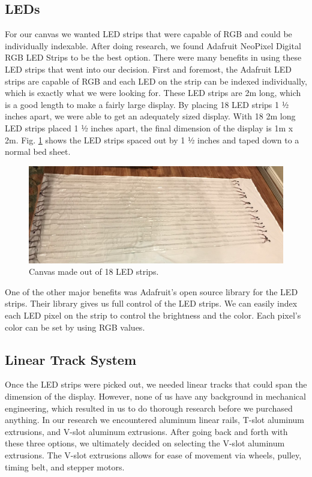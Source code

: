\documentclass[11pt]{IEEEtran}
\begin{document}
\subsection{LEDs}
For our canvas we wanted LED strips that were capable of RGB and could be individually indexable. After doing research, we found Adafruit NeoPixel Digital RGB LED Strips to be the best option. There were many benefits in using these LED strips that went into our decision. First and foremost, the Adafruit LED strips are capable of RGB and each LED on the strip can be indexed individually, which is exactly what we were looking for. These LED strips are 2m long, which is a good length to make a fairly large display. By placing 18 LED strips 1 ½ inches apart, we were able to get an adequately sized display. With 18 2m long LED strips placed 1 ½ inches apart, the final dimension of the display is 1m x 2m. Fig. \ref{fig:ledstripsonsheet} shows the LED strips spaced out by 1 ½ inches and taped down to a normal bed sheet.

\begin{figure}[H]
  \centering
  \includegraphics[width=\columnwidth]{image6.png}
  \caption{Canvas made out of 18 LED strips.}
  \label{fig:ledstripsonsheet}
\end{figure}

One of the other major benefits was Adafruit’s open source library for the LED strips. Their library gives us full control of the LED strips. We can easily index each LED pixel on the strip to control the brightness and the color. Each pixel’s color can be set by using RGB values.

\subsection{Linear Track System}
Once the LED strips were picked out, we needed linear tracks that could span the dimension of the display. However, none of us have any background in mechanical engineering, which resulted in us to do thorough research before we purchased anything. In our research we encountered aluminum linear rails, T-slot aluminum extrusions, and V-slot aluminum extrusions. After going back and forth with these three options, we ultimately decided on selecting the V-slot aluminum extrusions. The V-slot extrusions allows for ease of movement via wheels, pulley, timing belt, and stepper motors. 
\end{document}
